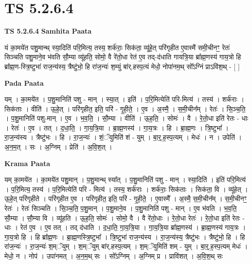 \documentclass[17pt]{extarticle}
\begin{document}
\section{ TS 5.2.6.4 }

\textbf{TS 5.2.6.4 } \newline
\textbf{Samhita Paata} \newline

यं का॒मये॑त पशु॒मान्थ् स्या॒दिति॑ परि॒मित्य॒ तस्य॒ शर्क॑राः॒ सिक॑ता॒ व्यू॑हे॒त् परि॑गृहीत ए॒वास्मै॑ समी॒चीनꣳ॒॒ रेतः॑ सिञ्चति पशु॒माने॒व भ॑वति सौ॒म्या व्यू॑हति॒ सोमो॒ वै रे॑तो॒धा रेत॑ ए॒व तद्-द॑धाति गायत्रि॒या ब्रा᳚ह्म॒णस्य॑ गाय॒त्रो हि ब्रा᳚ह्म॒ण-स्त्रि॒ष्टुभा॑ राज॒न्य॑स्य॒ त्रैष्टु॑भो॒ हि रा॑ज॒न्यः॑ श॒म्युं बा॑र्.हस्प॒त्यं मेधो॒ नोपा॑नम॒थ् सो᳚ऽग्निं प्राऽवि॑श॒थ् - [  ] \newline

\textbf{Pada Paata} \newline

यम् । का॒मये॑त । प॒शु॒मानिति॑ पशु - मान् । स्या॒त् । इति॑ । प॒रि॒मित्येति॑ परि-मित्य॑ । तस्य॑ । शर्क॑राः । सिक॑ताः । वीति॑ । ऊ॒हे॒त् । परि॑गृहीत॒ इति॒ परि॑ - गृ॒ही॒ते॒ । ए॒व । अ॒स्मै॒ । स॒मी॒चीन᳚म् । रेतः॑ । सि॒ञ्च॒ति॒ । प॒शु॒मानिति॑ पशु-मान् । ए॒व । भ॒व॒ति॒ । सौ॒म्या । वीति॑ । ऊ॒ह॒ति॒ । सोमः॑ । वै । रे॒तो॒धा इति॑ रेतः - धाः । रेतः॑ । ए॒व । तत् । द॒धा॒ति॒ । गा॒य॒त्रि॒या । ब्रा॒ह्म॒णस्य॑ । गा॒य॒त्रः । हि । ब्रा॒ह्म॒णः । त्रि॒ष्टुभा᳚ । रा॒ज॒न्य॑स्य । त्रैष्टु॑भः । हि । रा॒ज॒न्यः॑ । शं॒ॅयुमिति॑ शं - युम् । बा॒र्॒.ह॒स्प॒त्यम् । मेधः॑ । न । उपेति॑ । अ॒न॒म॒त् । सः । अ॒ग्निम् । प्रेति॑ । अ॒वि॒श॒त् ।  \newline


\textbf{Krama Paata} \newline

यम् का॒मये॑त । का॒मये॑त पशु॒मान् । प॒शु॒मान्थ् स्या᳚त् । प॒शु॒मानिति॑ पशु - मान् । स्या॒दिति॑ । इति॑ परि॒मित्य॑ । प॒रि॒मित्य॒ तस्य॑ । प॒रि॒मित्येति॑ परि - मित्य॑ । तस्य॒ शर्क॑राः । शर्क॑राः॒ सिक॑ताः । सिक॑ता॒ वि । व्यू॑हेत् । ऊ॒हे॒त् परि॑गृहीते । परि॑गृहीत ए॒व । परि॑गृहीत॒ इति॒ परि॑ - गृ॒ही॒ते॒ । ए॒वास्मै᳚ । अ॒स्मै॒ स॒मी॒चीन᳚म् । स॒मी॒चीनꣳ॒॒ रेतः॑ । रेतः॑ सिञ्चति । सि॒ञ्च॒ति॒ प॒शु॒मान् । प॒शु॒माने॒व । प॒शु॒मानिति॑ पशु - मान् । ए॒व भ॑वति । भ॒व॒ति॒ सौ॒म्या । सौ॒म्या वि । व्यू॑हति । ऊ॒ह॒ति॒ सोमः॑ । सोमो॒ वै । वै रे॑तो॒धाः । रे॒तो॒धा रेतः॑ । रे॒तो॒धा इति॑ रेतः - धाः । रेत॑ ए॒व । ए॒व तत् । तद् द॑धाति । द॒धा॒ति॒ गा॒य॒त्रि॒या । गा॒य॒त्रि॒या ब्रा᳚ह्म॒णस्य॑ । ब्रा॒ह्म॒णस्य॑ गाय॒त्रः । गा॒य॒त्रो हि । हि ब्रा᳚ह्म॒णः । ब्रा॒ह्म॒णस्त्रि॒ष्टुभा᳚ । त्रि॒ष्टुभा॑ राज॒न्य॑स्य । रा॒ज॒न्य॑स्य॒ त्रैष्टु॑भः । त्रैष्टु॑भो॒ हि । हि रा॑ज॒न्यः॑ । रा॒ज॒न्यः॑ श॒म्ॅयुम् । श॒म्ॅयुम् बा॑र्.हस्प॒त्यम् । श॒म्ॅयुमिति॑ शम् - युम् । बा॒र्॒.ह॒स्प॒त्यम् मेधः॑ । मेधो॒ न । नोप॑ । उपा॑नमत् । अ॒न॒म॒थ् सः । सो᳚ऽग्निम् । अ॒ग्निम् प्र । प्रावि॑शत् । अ॒वि॒श॒थ् सः \newline
\end{document}
